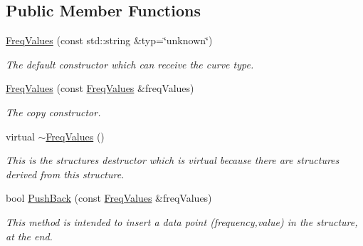 \subsection*{Public Member Functions}
\begin{DoxyCompactItemize}
\item 
\mbox{\label{structFreqValues_ab2ff89efb4571a8f6748017c6191d81e}} 
\hyperlink{structFreqValues_ab2ff89efb4571a8f6748017c6191d81e}{Freq\+Values} (const std\+::string \&typ=\char`\"{}unknown\char`\"{})
\begin{DoxyCompactList}\small\item\em The default constructor which can receive the curve type. \end{DoxyCompactList}\item 
\mbox{\label{structFreqValues_a7061709cf9faa8e7ee6cf2d15fd30a66}} 
\hyperlink{structFreqValues_a7061709cf9faa8e7ee6cf2d15fd30a66}{Freq\+Values} (const \hyperlink{structFreqValues}{Freq\+Values} \&freq\+Values)
\begin{DoxyCompactList}\small\item\em The copy constructor. \end{DoxyCompactList}\item 
\mbox{\label{structFreqValues_a6ec6ba96834034b3b91d1519b90027b7}} 
virtual \hyperlink{structFreqValues_a6ec6ba96834034b3b91d1519b90027b7}{$\sim$\+Freq\+Values} ()
\begin{DoxyCompactList}\small\item\em This is the structure\textquotesingle{}s destructor which is virtual because there are structures derived from this structure. \end{DoxyCompactList}\item 
\mbox{\label{structFreqValues_a01315cf6bb4ed4e21ee1b6441c44a850}} 
bool \hyperlink{structFreqValues_a01315cf6bb4ed4e21ee1b6441c44a850}{Push\+Back} (const \hyperlink{structFreqValues}{Freq\+Values} \&freq\+Values)
\begin{DoxyCompactList}\small\item\em This method is intended to insert a data point (frequency,value) in the structure, at the end. \end{DoxyCompactList}\item 
\mbox{\label{structFreqValues_a4449e9a4285ba2da83878bbb515e028a}} 

\end{DoxyCompactItemize}
